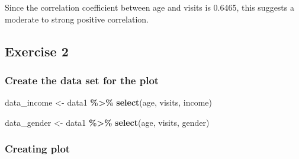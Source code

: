 \documentclass[
]{article}
\newenvironment{Shaded}{\begin{snugshade}}{\end{snugshade}}
\newcommand{\AttributeTok}[1]{\textcolor[rgb]{0.13,0.29,0.53}{#1}}
\newcommand{\FunctionTok}[1]{\textcolor[rgb]{0.13,0.29,0.53}{\textbf{#1}}}
\newcommand{\NormalTok}[1]{#1}
\newcommand{\OtherTok}[1]{\textcolor[rgb]{0.56,0.35,0.01}{#1}}
\newcommand{\SpecialCharTok}[1]{\textcolor[rgb]{0.81,0.36,0.00}{\textbf{#1}}}
\newcommand{\StringTok}[1]{\textcolor[rgb]{0.31,0.60,0.02}{#1}}
\begin{document}
Since the correlation coefficient between age and visits is 0.6465, this
suggests a moderate to strong positive correlation.

\subsection{Exercise 2}\label{exercise-2}

\subsubsection{Create the data set for the
plot}\label{create-the-data-set-for-the-plot}

\begin{Shaded}
\begin{Highlighting}[]
\NormalTok{data\_income }\OtherTok{\textless{}{-}}\NormalTok{ data1 }\SpecialCharTok{\%\textgreater{}\%}
  \FunctionTok{select}\NormalTok{(age, visits, income)}
\end{Highlighting}
\end{Shaded}

\begin{Shaded}
\begin{Highlighting}[]
\NormalTok{data\_gender }\OtherTok{\textless{}{-}}\NormalTok{ data1 }\SpecialCharTok{\%\textgreater{}\%}
  \FunctionTok{select}\NormalTok{(age, visits, gender)}
\end{Highlighting}
\end{Shaded}

\begin{Shaded}
\end{Shaded}

\subsubsection{Creating plot}\label{creating-plot}
\end{document}
